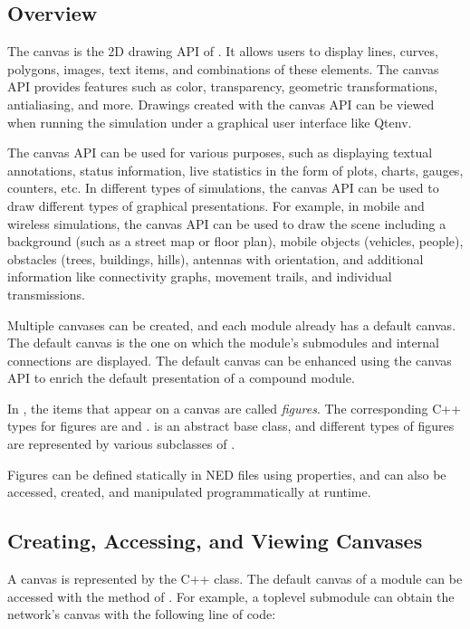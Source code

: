 \subsection{Overview}
\label{sec:graphics:canvas-overview}

The canvas is the 2D drawing API of {\opp}. It allows users to display lines,
curves, polygons, images, text items, and combinations of these elements. The
canvas API provides features such as color, transparency, geometric
transformations, antialiasing, and more. Drawings created with the canvas API
can be viewed when running the simulation under a graphical user interface like
Qtenv.

The canvas API can be used for various purposes, such as displaying textual
annotations, status information, live statistics in the form of plots, charts,
gauges, counters, etc. In different types of simulations, the canvas API can be
used to draw different types of graphical presentations. For example, in mobile
and wireless simulations, the canvas API can be used to draw the scene including
a background (such as a street map or floor plan), mobile objects (vehicles,
people), obstacles (trees, buildings, hills), antennas with orientation, and
additional information like connectivity graphs, movement trails, and individual
transmissions.

Multiple canvases can be created, and each module already has a default canvas.
The default canvas is the one on which the module's submodules and internal
connections are displayed. The default canvas can be enhanced using the canvas
API to enrich the default presentation of a compound module.

In {\opp}, the items that appear on a canvas are called \textit{figures}. The
corresponding C++ types for figures are  and .
 is an abstract base class, and different types of figures are
represented by various subclasses of .

Figures can be defined statically in NED files using  properties,
and can also be accessed, created, and manipulated programmatically at runtime.


\subsection{Creating, Accessing, and Viewing Canvases}
\label{sec:graphics:creating-accessing-and-viewing-canvases}

A canvas is represented by the  C++ class. The default canvas of
a module can be accessed with the  method of
. For example, a toplevel submodule can obtain the network's
canvas with the following line of code:

